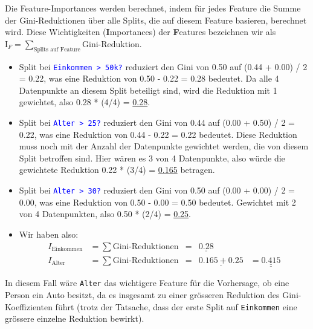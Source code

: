 \begin{myexample}
    Die Feature-Importances werden berechnet, indem für jedes Feature die Summe der Gini-Reduktionen über alle Splits, die auf diesem Feature basieren, berechnet wird. Diese Wichtigkeiten (\textbf{I}mportances) der \textbf{F}eatures bezeichnen wir als $\text{I}_F = \sum_{\text{Splits auf Feature}} \text{Gini-Reduktion}$.
    \begin{itemize}
        \item Split bei \textcolor{blue}{\texttt{Einkommen > 50k?}} reduziert den Gini von 0.50 auf (0.44 + 0.00) / 2 = 0.22, was eine Reduktion von 0.50 - 0.22 = 0.28 bedeutet. Da alle 4 Datenpunkte an diesem Split beteiligt sind, wird die Reduktion mit 1 gewichtet, also 0.28 * (4/4) = \underline{0.28}.
        \item Split bei \textcolor{blue}{\texttt{Alter > 25?}} reduziert den Gini von 0.44 auf (0.00 + 0.50) / 2 = 0.22, was eine Reduktion von 0.44 - 0.22 = 0.22 bedeutet. Diese Reduktion muss noch mit der Anzahl der Datenpunkte gewichtet werden, die von diesem Split betroffen sind. Hier wären es 3 von 4 Datenpunkte, also würde die gewichtete Reduktion 0.22 * (3/4) = \underline{0.165} betragen.
        \item Split bei \textcolor{blue}{\texttt{Alter > 30?}} reduziert den Gini von 0.50 auf (0.00 + 0.00) / 2 = 0.00, was eine Reduktion von 0.50 - 0.00 = 0.50 bedeutet. Gewichtet mit 2 von 4 Datenpunkten, also 0.50 * (2/4) = \underline{0.25}.
        \item Wir haben also:
              \[
                  \begin{aligned}
                      I_\text{Einkommen} & = \sum \text{Gini-Reduktionen} & = & \underline{\underline{0.28}} &                                 \\
                      I_\text{Alter}     & = \sum \text{Gini-Reduktionen} & = & \underline{0.165 + 0.25}     & = \underline{\underline{0.415}}
                  \end{aligned}
              \]
    \end{itemize}
    In diesem Fall wäre \texttt{Alter} das wichtigere Feature für die Vorhersage, ob eine Person ein Auto besitzt, da es insgesamt zu einer grösseren Reduktion des Gini-Koeffizienten führt (trotz der Tatsache, dass der erste Split auf \texttt{Einkommen} eine grössere einzelne Reduktion bewirkt).
\end{myexample}

